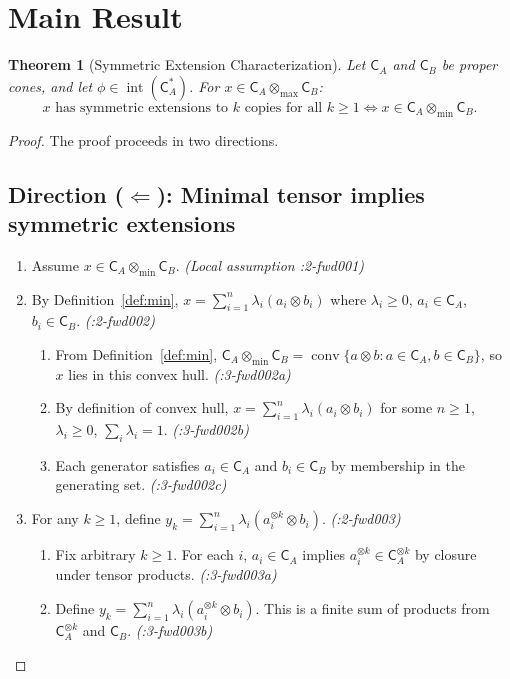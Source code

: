 \documentclass[11pt,a4paper]{article}
\theoremstyle{definition}
\theoremstyle{plain}
\newtheorem{theorem}{Theorem}[section]
\newcommand{\proofstep}[2]{\item[$\langle #1 \rangle$#2.]}
\DeclareMathOperator{\conv}{conv}
\DeclareMathOperator{\inte}{int}
\newcommand{\tmin}{{\otimes_{\min}}}
\newcommand{\tmax}{{\otimes_{\max}}}
\newcommand{\C}{\mathsf{C}}
\begin{document}
\section{Main Result}

\begin{theorem}[Symmetric Extension Characterization] \label{thm:main}
Let $\C_A$ and $\C_B$ be proper cones, and let $\phi \in \inte(\C_A^*)$. For $x \in \C_A \tmax \C_B$:
\[
x \text{ has symmetric extensions to } k \text{ copies for all } k \geq 1 \iff x \in \C_A \tmin \C_B.
\]
\end{theorem}

\begin{proof}
The proof proceeds in two directions.

\subsection*{Direction ($\Leftarrow$): Minimal tensor implies symmetric extensions}

\begin{enumerate}[leftmargin=2em]
\proofstep{1}{1} Assume $x \in \C_A \tmin \C_B$. \textit{(Local assumption :2-fwd001)}

\proofstep{1}{2} By Definition~\ref{def:min}, $x = \sum_{i=1}^n \lambda_i (a_i \otimes b_i)$ where $\lambda_i \geq 0$, $a_i \in \C_A$, $b_i \in \C_B$. \textit{(:2-fwd002)}
\begin{enumerate}[leftmargin=1.5em, label=$\langle 2.\alph* \rangle$]
\item From Definition~\ref{def:min}, $\C_A \tmin \C_B = \conv\{a \otimes b : a \in \C_A, b \in \C_B\}$, so $x$ lies in this convex hull. \textit{(:3-fwd002a)}
\item By definition of convex hull, $x = \sum_{i=1}^n \lambda_i (a_i \otimes b_i)$ for some $n \geq 1$, $\lambda_i \geq 0$, $\sum_i \lambda_i = 1$. \textit{(:3-fwd002b)}
\item Each generator satisfies $a_i \in \C_A$ and $b_i \in \C_B$ by membership in the generating set. \textit{(:3-fwd002c)}
\end{enumerate}

\proofstep{1}{3} For any $k \geq 1$, define $y_k = \sum_{i=1}^n \lambda_i (a_i^{\otimes k} \otimes b_i)$. \textit{(:2-fwd003)}
\begin{enumerate}[leftmargin=1.5em, label=$\langle 2.\alph* \rangle$]
\item Fix arbitrary $k \geq 1$. For each $i$, $a_i \in \C_A$ implies $a_i^{\otimes k} \in \C_A^{\otimes k}$ by closure under tensor products. \textit{(:3-fwd003a)}
\item Define $y_k = \sum_{i=1}^n \lambda_i (a_i^{\otimes k} \otimes b_i)$. This is a finite sum of products from $\C_A^{\otimes k}$ and $\C_B$. \textit{(:3-fwd003b)}
\end{enumerate}


\end{enumerate}
\end{proof}
\end{document}
